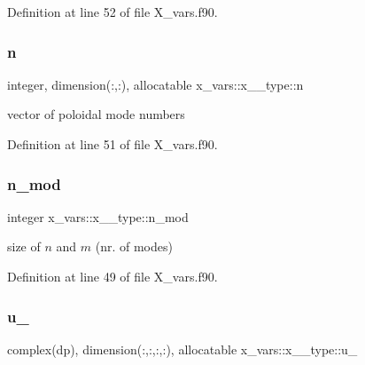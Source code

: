 Definition at line 52 of file X\+\_\+vars.\+f90.

\mbox{\label{structx__vars_1_1x__1__type_aa8357fc77cfb833b7ead7310fe8cdd2a}} 
\subsubsection{\texorpdfstring{n}{n}}
{\footnotesize\ttfamily integer, dimension(\+:,\+:), allocatable x\+\_\+vars\+::x\+\_\+\_\+type\+::n}



vector of poloidal mode numbers 



Definition at line 51 of file X\+\_\+vars.\+f90.

\mbox{\label{structx__vars_1_1x__1__type_a2c6f8950aab84d1c8496d676765e495d}} 
\subsubsection{\texorpdfstring{n\+\_\+mod}{n\_mod}}
{\footnotesize\ttfamily integer x\+\_\+vars\+::x\+\_\+\_\+type\+::n\+\_\+mod}



size of $n$ and $m$ (nr. of modes) 



Definition at line 49 of file X\+\_\+vars.\+f90.

\mbox{\label{structx__vars_1_1x__1__type_a49ba10abb2c45fc9f6faf0412f7af198}} 
\subsubsection{\texorpdfstring{u\+\_}{u\_0}}
{\footnotesize\ttfamily complex(dp), dimension(\+:,\+:,\+:,\+:), allocatable x\+\_\+vars\+::x\+\_\+\_\+type\+::u\+\_}



